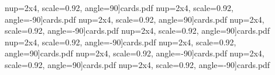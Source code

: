 \documentclass{article}
\begin{document}
 nup=2x4, scale=0.92, angle=90]{cards.pdf}
 nup=2x4, scale=0.92, angle=-90]{cards.pdf}
 nup=2x4, scale=0.92, angle=90]{cards.pdf}
 nup=2x4, scale=0.92, angle=-90]{cards.pdf}
 nup=2x4, scale=0.92, angle=90]{cards.pdf}
 nup=2x4, scale=0.92, angle=-90]{cards.pdf}
 nup=2x4, scale=0.92, angle=90]{cards.pdf}
 nup=2x4, scale=0.92, angle=-90]{cards.pdf}
 nup=2x4, scale=0.92, angle=90]{cards.pdf}
 nup=2x4, scale=0.92, angle=-90]{cards.pdf}
\end{document}
